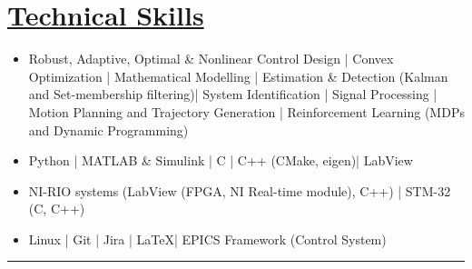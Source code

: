 \section*{\underline{Technical Skills}}
\begin{itemize}
        \item[\itbf{Control and Estimation:}] Robust, Adaptive, Optimal \& Nonlinear Control Design |
        Convex Optimization | Mathematical Modelling |
        Estimation \& Detection (Kalman and Set-membership filtering)|
        System Identification | Signal Processing |
        Motion Planning and Trajectory Generation |
        Reinforcement Learning (MDPs and Dynamic Programming)
        \item[\itbf{Programming:}] Python | MATLAB \& Simulink | C | C++ (CMake, eigen)| LabView
        \item[\itbf{Embedded Systems:}] NI-RIO systems (LabView (FPGA, NI Real-time module), C++) | STM-32 (C, C++)
        \item[\itbf{OS \& Tools:}] Linux | Git | Jira | \LaTeX | EPICS Framework (Control System)
\end{itemize}
\noindent\rule{\textwidth}{0.4pt}
